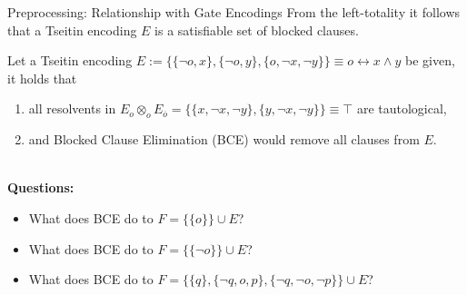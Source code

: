 \documentclass[t]{sdqbeamer}
\begin{document}
\begin{frame}{Preprocessing: Relationship with Gate Encodings}
From the left-totality it follows that a Tseitin encoding $E$ is a satisfiable set of blocked clauses.\\[1em]
\begin{example}
Let a Tseitin encoding $E := \bigl\{\{ \lnot o, x \}, \{ \lnot o, y \}, \{ o, \lnot x, \lnot y \} \bigr\} \equiv o \leftrightarrow x \land y$ be given, it holds that\\[1em]
\begin{enumerate}\setlength{\itemsep}{1ex}
\item all resolvents in $E_o \otimes_o E_{\overline o} = \bigl\{ \{ x, \lnot x, \lnot y \}, \{ y, \lnot x, \lnot y \} \bigr\} \equiv \top$ are tautological,
\item and Blocked Clause Elimination (BCE) would remove all clauses from $E$.\\[1ex]
\end{enumerate}
\end{example}~\\[-1ex]
\textbf{Questions:}\\[1ex]
\begin{itemize}\setlength{\itemsep}{1ex}
\item What does BCE do to $F = \bigl\{ \{ o \} \bigr\} \cup E$?
\item What does BCE do to $F = \bigl\{ \{ \lnot o \} \bigr\} \cup E$?
\item What does BCE do to $F = \bigl\{ \{ q \}, \{ \lnot q, o, p \}, \{ \lnot q, \lnot o, \lnot p \} \bigr\} \cup E$?
\end{itemize}
\end{frame}
\end{document}
